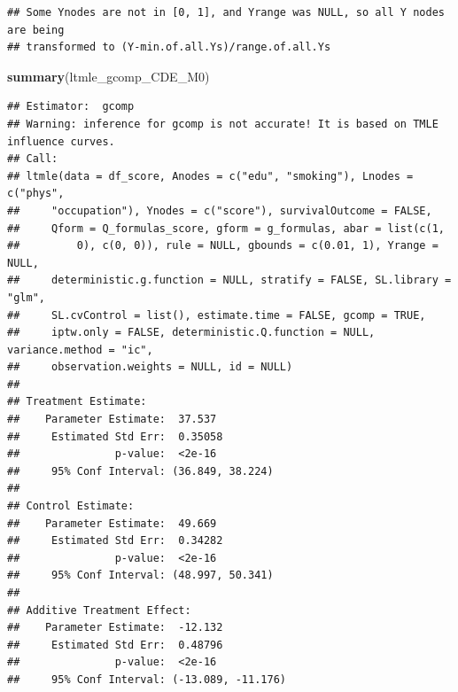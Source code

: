\documentclass[
]{book}
\newenvironment{Shaded}{\begin{snugshade}}{\end{snugshade}}
\newcommand{\CommentTok}[1]{\textcolor[rgb]{0.56,0.35,0.01}{\textit{#1}}}
\newcommand{\FunctionTok}[1]{\textcolor[rgb]{0.13,0.29,0.53}{\textbf{#1}}}
\newcommand{\NormalTok}[1]{#1}
\newcommand{\SpecialCharTok}[1]{\textcolor[rgb]{0.81,0.36,0.00}{\textbf{#1}}}
\begin{document}
\begin{verbatim}
## Some Ynodes are not in [0, 1], and Yrange was NULL, so all Y nodes are being
## transformed to (Y-min.of.all.Ys)/range.of.all.Ys
\end{verbatim}

\begin{Shaded}
\begin{Highlighting}[]
\FunctionTok{summary}\NormalTok{(ltmle\_gcomp\_CDE\_M0)}
\end{Highlighting}
\end{Shaded}

\begin{verbatim}
## Estimator:  gcomp 
## Warning: inference for gcomp is not accurate! It is based on TMLE influence curves.
## Call:
## ltmle(data = df_score, Anodes = c("edu", "smoking"), Lnodes = c("phys", 
##     "occupation"), Ynodes = c("score"), survivalOutcome = FALSE, 
##     Qform = Q_formulas_score, gform = g_formulas, abar = list(c(1, 
##         0), c(0, 0)), rule = NULL, gbounds = c(0.01, 1), Yrange = NULL, 
##     deterministic.g.function = NULL, stratify = FALSE, SL.library = "glm", 
##     SL.cvControl = list(), estimate.time = FALSE, gcomp = TRUE, 
##     iptw.only = FALSE, deterministic.Q.function = NULL, variance.method = "ic", 
##     observation.weights = NULL, id = NULL)
## 
## Treatment Estimate:
##    Parameter Estimate:  37.537 
##     Estimated Std Err:  0.35058 
##               p-value:  <2e-16 
##     95% Conf Interval: (36.849, 38.224) 
## 
## Control Estimate:
##    Parameter Estimate:  49.669 
##     Estimated Std Err:  0.34282 
##               p-value:  <2e-16 
##     95% Conf Interval: (48.997, 50.341) 
## 
## Additive Treatment Effect:
##    Parameter Estimate:  -12.132 
##     Estimated Std Err:  0.48796 
##               p-value:  <2e-16 
##     95% Conf Interval: (-13.089, -11.176)
\end{verbatim}

\begin{Shaded}
\end{Shaded}
\end{document}
